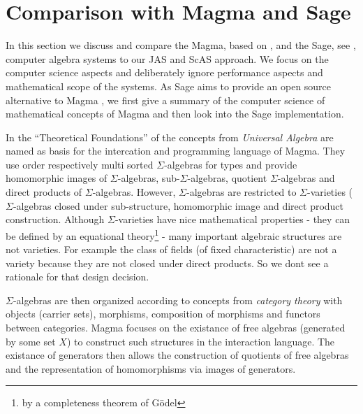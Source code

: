 \documentclass{llncs}
\begin{document}
\section{Comparison with Magma and Sage} %
\label{sec:magma}

In this section we discuss and compare the Magma, based on
\cite{BosmaCannonMatthews:1994,BosmaCannonPlayoust:1997}, and the
Sage, see \cite{Stein:2005,SageWiki:2009}, computer algebra systems to
our JAS and ScAS approach. We focus on the computer science aspects
and deliberately ignore performance aspects and mathematical scope of
the systems.
%
As Sage aims to provide an open source alternative to Magma
\cite{SageWiki:2009}, we first give a summary of the computer science
of mathematical concepts of Magma and then look into the Sage
implementation.


In the ``Theoretical Foundations'' of \cite{BosmaCannonPlayoust:1997}
the concepts from {\em Universal Algebra} are named as basis for the
intercation and programming language of Magma. They use order
respectively multi sorted $\Sigma$-algebras for types and provide
homomorphic images of $\Sigma$-algebras, sub-$\Sigma$-algebras,
quotient $\Sigma$-algebras and direct products of $\Sigma$-algebras.
%
However, $\Sigma$-algebras are restricted to $\Sigma$-varieties
($\Sigma$-algebras closed under sub-structure, homomorphic image and
direct product construction.
Although $\Sigma$-varieties have nice mathematical properties - they
can be defined by an equational theory\footnote{by a completeness
  theorem of G\"odel} - many important algebraic structures are not
varieties. For example the class of fields (of fixed characteristic)
are not a variety because they are not closed under direct products.
So we dont see a rationale for that design decision.

$\Sigma$-algebras are then organized according to concepts from {\em
  category theory} with objects (carrier sets), morphisms, composition
of morphisms and functors between categories. Magma focuses on the
existance of free algebras (generated by some set $X$) to construct
such structures in the interaction language. The existance of
generators then allows the construction of quotients of free algebras
and the representation of homomorphisms via images of generators.
\end{document}
